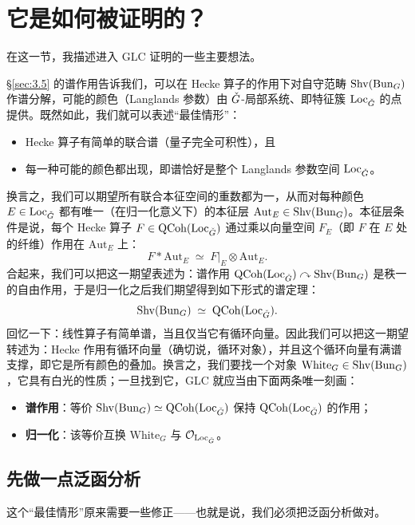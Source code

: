 \section{它是如何被证明的？}\label{sec:5}

在这一节，我描述进入 GLC 证明的一些主要想法。

\S\ref{sec:3.5} 的谱作用告诉我们，可以在 Hecke 算子的作用下对自守范畴 $\operatorname{Shv}(\operatorname{Bun}_{G})$ 作谱分解，可能的颜色（Langlands 参数）由 $\check{G}$-局部系统、即特征簇 $\operatorname{Loc}_{\check{G}}$ 的点提供。既然如此，我们就可以表述“最佳情形”：

\begin{itemize}
\item Hecke 算子有简单的联合谱（量子完全可积性），且
\item 每一种可能的颜色都出现，即谱恰好是整个 Langlands 参数空间 $\operatorname{Loc}_{\check{G}}$。
\end{itemize}

换言之，我们可以期望所有联合本征空间的重数都为一，从而对每种颜色 $E\in\operatorname{Loc}_{\check{G}}$ 都有唯一（在归一化意义下）的本征层 $\mathrm{Aut}_{E}\in\operatorname{Shv}(\operatorname{Bun}_{G})$。本征层条件是说，每个 Hecke 算子 $F\in\operatorname{QCoh}(\operatorname{Loc}_{\check{G}})$ 通过乘以向量空间 $F_{E}$（即 $F$ 在 $E$ 处的纤维）作用在 $\mathrm{Aut}_{E}$ 上：
\[
F*\mathrm{Aut}_{E}\;\simeq\;F|_{E}\otimes\mathrm{Aut}_{E}.
\]
合起来，我们可以把这一期望表述为：谱作用 $\operatorname{QCoh}(\operatorname{Loc}_{\check{G}})\curvearrowright\operatorname{Shv}(\operatorname{Bun}_{G})$ 是秩一的自由作用，于是归一化之后我们期望得到如下形式的谱定理：
\[
\operatorname{Shv}(\operatorname{Bun}_{G})\;\simeq\;\operatorname{QCoh}(\operatorname{Loc}_{\check{G}}).
\]
回忆一下：线性算子有简单谱，当且仅当它有循环向量。因此我们可以把这一期望转述为：Hecke 作用有循环向量（确切说，循环对象），并且这个循环向量有满谱支撑，即它是所有颜色的叠加。换言之，我们要找一个对象 $\mathrm{White}_{G}\in\operatorname{Shv}(\operatorname{Bun}_{G})$，它具有白光的性质；一旦找到它，GLC 就应当由下面两条唯一刻画：

\begin{itemize}
\item \textbf{谱作用}：等价 $\operatorname{Shv}(\operatorname{Bun}_{G})\simeq\operatorname{QCoh}(\operatorname{Loc}_{\check{G}})$ 保持 $\operatorname{QCoh}(\operatorname{Loc}_{\check{G}})$ 的作用；
\item \textbf{归一化}：该等价互换 $\mathrm{White}_{G}$ 与 $\mathcal{O}_{\operatorname{Loc}_{\check{G}}}$。
\end{itemize}

\subsection{先做一点泛函分析}\label{sec:5.1}

这个“最佳情形”原来需要一些修正——也就是说，我们必须把泛函分析做对。

